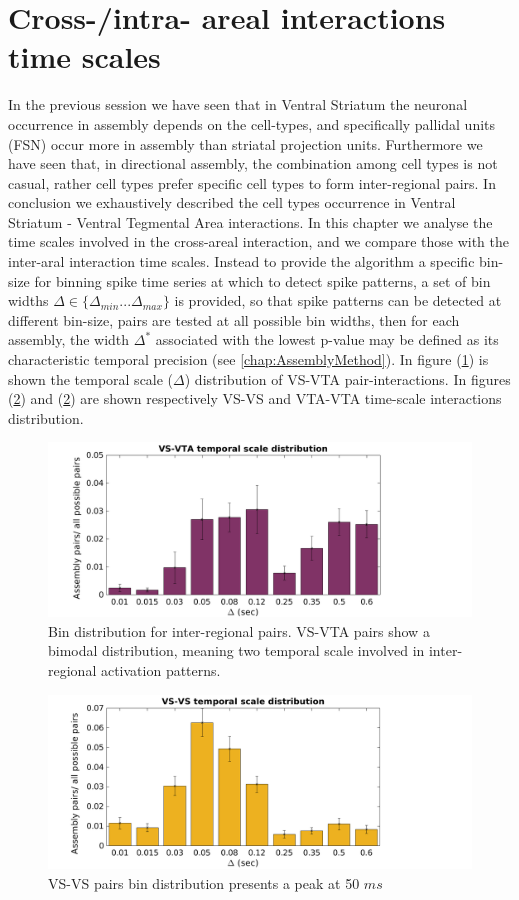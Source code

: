 \section{Cross-/intra- areal interactions time scales}
In the previous session we have seen that in Ventral Striatum the neuronal occurrence in assembly depends on the cell-types, and specifically pallidal units (FSN) occur more in assembly than striatal projection units. Furthermore we have seen that, in directional assembly, the combination among cell types is not casual, rather cell types prefer specific cell types to form inter-regional pairs.
In conclusion we exhaustively described the cell types occurrence in Ventral Striatum - Ventral Tegmental Area interactions. In this chapter we analyse the time scales involved in the cross-areal interaction, and we compare those with the inter-aral interaction time scales.
Instead to provide the algorithm a specific bin-size for binning spike time series at which to detect spike patterns, a set of bin widths $\Delta \in \{\Delta_{min}...\Delta_{max}\}$ is provided, so that spike patterns can be detected at different bin-size, pairs are tested at all possible bin widths, then for each assembly, the width $\Delta^*$ associated with the lowest p-value may be defined as its characteristic temporal precision (see \autoref{chap:AssemblyMethod}).
In figure (\ref{fig:BinDistr}) is shown the temporal scale ($\Delta$) distribution of VS-VTA pair-interactions.
In figures (\ref{fig:BinDistrVS}) and (\ref{fig:BinDistrVS}) are shown respectively VS-VS  and VTA-VTA time-scale interactions distribution.
\begin{figure}[H]
\includegraphics[scale=0.45]{figures/VS_VTA_Short1.png}
\caption{Bin distribution for inter-regional pairs. VS-VTA pairs show a bimodal distribution, meaning two temporal scale involved in inter-regional activation patterns.
}
\label{fig:BinDistr}
\end{figure}
\begin{figure}[H]
\includegraphics[scale=0.45]{figures/VS_VS_S.png}
\caption{VS-VS pairs bin distribution presents a peak at 50 $ms$}
\label{fig:BinDistrVS}
\end{figure}
